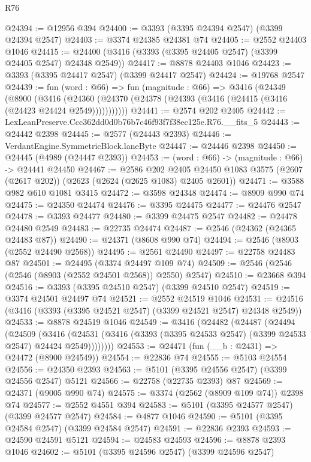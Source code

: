 \begin{lexlean}{R76}
\begin{coremodule}
@24394 := @12956 @394
@24400 := @3393 (@3395 @24394 @2547) (@3399 @24394 @2547)
@24403 := @3374 @24385 @24381 @74
@24405 := @2552 @24403 @1046
@24415 := @24400 (@3416 (@3393 (@3395 @24405 @2547) (@3399 @24405 @2547) @24348 @2549))
@24417 := @8878 @24403 @1046
@24423 := @3393 (@3395 @24417 @2547) (@3399 @24417 @2547)
@24424 := @19768 @2547
@24439 := fun (word : @66) =>
  fun (magnitude : @66) =>
  @3416
    (@24349
      (@8900
        (@3416 (@24360 (@24370 (@24378 (@24393 (@3416 (@24415 (@3416 (@24423 @24424 @2549)))))))))))
@24441 := @2574 @202 @2405
@24442 := LexLeanPreserve.Ccc362dd0d0b76b7c46f93f7f38ec125e.R76.__fits_5
@24443 := @24442 @2398
@24445 := @2577 (@24443 @2393)
@24446 := VerdantEngine.SymmetricBlock.laneByte
@24447 := @24446 @2398
@24450 := @24445 (@4989 (@24447 @2393))
@24453 := (word : @66) -> (magnitude : @66) -> @24441 @24450
@24467 := @2586
    @202
    @2405
    @24450
    @1083
    @3575
    (@2607 (@2617 @202))
    (@2623 (@2624 (@2625 @1083) @2405 @2601))
@24471 := @3588 @982 @610 @1081 @3415
@24472 := @3598 @24348
@24474 := @8909 @990 @74
@24475 := @24350 @24474
@24476 := @3395 @24475
@24477 := @24476 @2547
@24478 := @3393 @24477
@24480 := @3399 @24475 @2547
@24482 := @24478 @24480 @2549
@24483 := @22735 @24474
@24487 := @2546 (@24362 (@24365 @24483 @87))
@24490 := @24371 (@8608 @990 @74)
@24494 := @2546 (@8903 (@2552 @24490 @2568))
@24495 := @2561 @24490
@24497 := @22758 @24483 @87
@24501 := @24495 (@3374 @24497 @109 @74)
@24509 := @2546 (@2546 (@2546 (@8903 (@2552 @24501 @2568)) @2550) @2547)
@24510 := @23668 @394
@24516 := @3393 (@3395 @24510 @2547) (@3399 @24510 @2547)
@24519 := @3374 @24501 @24497 @74
@24521 := @2552 @24519 @1046
@24531 := @24516 (@3416 (@3393 (@3395 @24521 @2547) (@3399 @24521 @2547) @24348 @2549))
@24533 := @8878 @24519 @1046
@24549 := @3416
    (@24482
      (@24487
        (@24494
          (@24509
            (@3416
              (@24531 (@3416 (@3393 (@3395 @24533 @2547) (@3399 @24533 @2547) @24424 @2549))))))))
@24553 := @24471 (fun (__b : @2431) => @24472 (@8900 @24549))
@24554 := @22836 @74
@24555 := @5103 @24554
@24556 := @24350 @2393
@24563 := @5101 (@3395 @24556 @2547) (@3399 @24556 @2547) @5121
@24566 := @22758 (@22735 @2393) @87
@24569 := @24371 (@9005 @990 @74)
@24575 := @3374 (@2562 (@8909 @109 @74)) @2398 @74
@24577 := @2552 @4551 @394
@24583 := @5101 (@3395 @24577 @2547) (@3399 @24577 @2547)
@24584 := @4877 @1046
@24590 := @5101 (@3395 @24584 @2547) (@3399 @24584 @2547)
@24591 := @22836 @2393
@24593 := @24590 @24591 @5121
@24594 := @24583 @24593
@24596 := @8878 @2393 @1046
@24602 := @5101 (@3395 @24596 @2547) (@3399 @24596 @2547)

\end{coremodule}
\end{lexlean}
